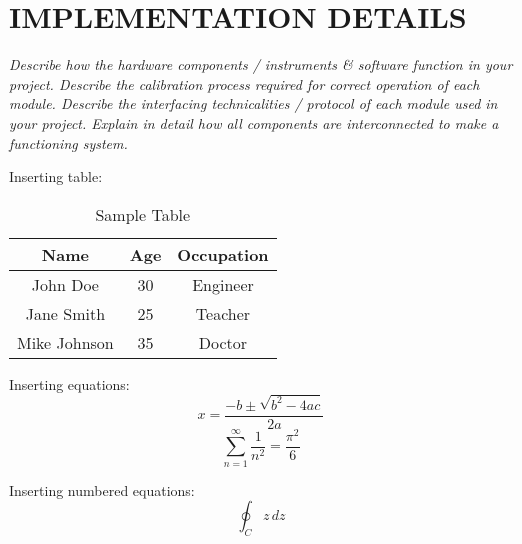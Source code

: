\section{\MakeUppercase{Implementation Details}}
    \textit{Describe how the hardware components / instruments \& software function in your project. Describe the calibration process required for correct operation of each module. Describe the interfacing technicalities / protocol of each module used in your project. Explain in detail how all components are interconnected to make a functioning system.}

    Inserting table:
    \begin{table}[H]
        \caption{Sample Table}
        \label{tab:sample}
        \centering
        \begin{tabular}{|c|c|c|}
            \hline
            \textbf{Name} & \textbf{Age} & \textbf{Occupation} \\
            \hline
            John Doe & 30 & Engineer \\
            Jane Smith & 25 & Teacher \\
            Mike Johnson & 35 & Doctor \\
            \hline
        \end{tabular}
    \end{table}
    
    Inserting equations:
    $$ x = \frac{-b \pm \sqrt{b^2 - 4ac}}{2a} $$
    \[ 
        \sum_{n=1}^{\infty} \frac{1}{n^2} = \frac{\pi^2}{6}
    \]
    
    Inserting numbered equations:
    \begin{equation} \label{eqn:integral}
        \oint_C z\,dz
    \end{equation}
